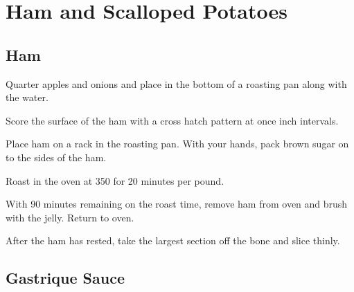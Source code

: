
\section{Ham and Scalloped Potatoes}
\begin{recipe}


\subsection{Ham}



Quarter apples and onions and place in the bottom of a roasting pan along with the water.

Score the surface of the ham with a cross hatch pattern at once inch intervals.

Place ham on a rack in the roasting pan. With your hands, pack brown sugar on to the sides of the ham.

Roast in the oven at 350\degree{} for 20 minutes per pound.


With 90 minutes remaining on the roast time, remove ham from oven and brush with the jelly. Return to oven.

After the ham has rested, take the largest section off the bone and slice thinly.

\subsection{Gastrique Sauce}


\end{recipe}
